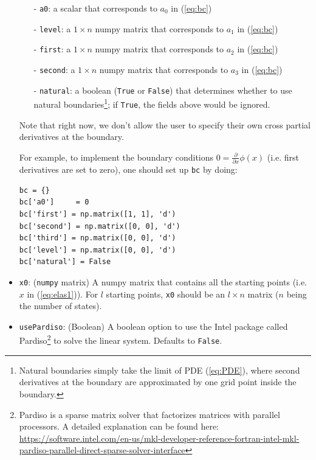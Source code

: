 \documentclass[12pt]{article}
\begin{document}
\begin{itemize}
\begin{itemize}
\item[-] \texttt{a0}: a scalar that corresponds to $a_0$ in (\ref{eq:bc})
\item[-] \texttt{level}: a $1 \times n$ numpy matrix that corresponds to $a_1$ in (\ref{eq:bc})
\item[-] \texttt{first}: a $1 \times n$ numpy matrix that corresponds to $a_2$ in (\ref{eq:bc})
\item[-] \texttt{second}: a $1 \times n$ numpy matrix that corresponds to $a_3$ in (\ref{eq:bc})
\item[-] \texttt{natural}: a boolean (\texttt{True} or \texttt{False}) that determines whether to use natural boundaries\footnote{Natural boundaries simply take the limit of PDE (\ref{eq:PDE}), where second derivatives at the boundary are approximated by one grid point inside the boundary.}; if \texttt{True}, the fields above would be ignored.
\end{itemize}

Note that right now, we don't allow the user to specify their own cross partial derivatives at the boundary.

For example, to implement the boundary conditions $0 =  \frac{\partial}{\partial x} \phi (x) $ (i.e. first derivatives are set to zero), one should set up \texttt{bc} by doing:


\begin{verbatim}
bc = {}
bc['a0']	 = 0
bc['first'] = np.matrix([1, 1], 'd')
bc['second'] = np.matrix([0, 0], 'd')
bc['third'] = np.matrix([0, 0], 'd')
bc['level'] = np.matrix([0, 0], 'd')
bc['natural'] = False
\end{verbatim}

\item \texttt{x0}: (\texttt{numpy} matrix) A numpy matrix that contains all the starting points (i.e. $x$ in (\ref{eq:elas1})). For $l$ starting points, \texttt{x0} should be an $l \times n$ matrix ($n$ being the number of states).

\item \texttt{usePardiso}: (Boolean) A boolean option to use the Intel package called
Pardiso\footnote{Pardiso is a sparse matrix solver that factorizes matrices with parallel processors. A detailed explanation can be found here: \href{https://software.intel.com/en-us/mkl-developer-reference-fortran-intel-mkl-pardiso-parallel-direct-sparse-solver-interface}{https://software.intel.com/en-us/mkl-developer-reference-fortran-intel-mkl-pardiso-parallel-direct-sparse-solver-interface}} to solve the linear system. Defaults to \texttt{False}.


\end{itemize}
\end{document}
